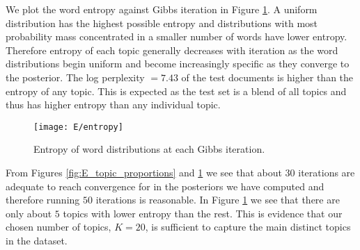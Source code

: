 \documentclass[11pt]{article}
\begin{document}
We plot the word entropy against Gibbs iteration in Figure \ref{fig:E_entropy}. A uniform distribution has the highest possible entropy and distributions with most probability mass concentrated in a smaller number of words have lower entropy. Therefore entropy of each topic generally decreases with iteration as the word distributions begin uniform and become increasingly specific as they converge to the posterior. The log perplexity $=7.43$ of the test documents is higher than the entropy of any topic. This is expected as the test set is a blend of all topics and thus has higher entropy than any individual topic.

\begin{figure}
    \centering
    \texttt{[image: E/entropy]}
    \caption{Entropy of word distributions at each Gibbs iteration.}
    \label{fig:E_entropy}
\end{figure}

From Figures \ref{fig:E_topic_proportions} and \ref{fig:E_entropy} we see that about $30$ iterations are adequate to reach convergence for in the posteriors we have computed and therefore running $50$ iterations is reasonable. In Figure \ref{fig:E_entropy} we see that there are only about $5$ topics with lower entropy than the rest. This is evidence that our chosen number of topics, $K = 20$, is sufficient to capture the main distinct topics in the dataset.
\end{document}
